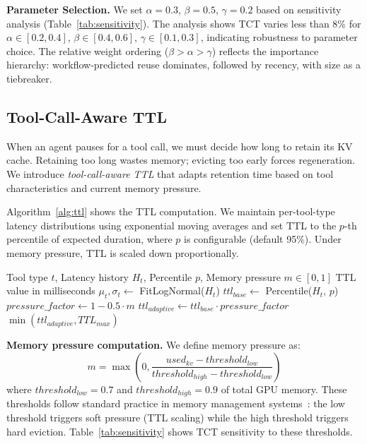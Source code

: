\documentclass[sigconf]{acmart}
\begin{document}
\textbf{Parameter Selection.} We set $\alpha = 0.3$, $\beta = 0.5$, $\gamma = 0.2$ based on sensitivity analysis (Table~\ref{tab:sensitivity}). The analysis shows TCT varies less than 8\% for $\alpha \in [0.2, 0.4]$, $\beta \in [0.4, 0.6]$, $\gamma \in [0.1, 0.3]$, indicating robustness to parameter choice. The relative weight ordering ($\beta > \alpha > \gamma$) reflects the importance hierarchy: workflow-predicted reuse dominates, followed by recency, with size as a tiebreaker.

\subsection{Tool-Call-Aware TTL}
\label{sec:ttl}

When an agent pauses for a tool call, we must decide how long to retain its KV cache. Retaining too long wastes memory; evicting too early forces regeneration. We introduce \emph{tool-call-aware TTL} that adapts retention time based on tool characteristics and current memory pressure.

Algorithm~\ref{alg:ttl} shows the TTL computation. We maintain per-tool-type latency distributions using exponential moving averages and set TTL to the $p$-th percentile of expected duration, where $p$ is configurable (default 95\%). Under memory pressure, TTL is scaled down proportionally.

\begin{algorithm}[t]
\caption{Tool-Call-Aware TTL Computation}
\label{alg:ttl}
\begin{algorithmic}[1]
\REQUIRE Tool type $t$, Latency history $H_t$, Percentile $p$, Memory pressure $m \in [0,1]$
\ENSURE TTL value in milliseconds
\STATE $\mu_t, \sigma_t \gets$ FitLogNormal($H_t$) 
\STATE $ttl_{base} \gets$ Percentile($H_t$, $p$)
\STATE $pressure\_factor \gets 1 - 0.5 \cdot m$ 
\STATE $ttl_{adaptive} \gets ttl_{base} \cdot pressure\_factor$
\RETURN $\min(ttl_{adaptive}, TTL_{max})$ 
\end{algorithmic}
\end{algorithm}

\textbf{Memory pressure computation.} We define memory pressure as:
\begin{equation}
\label{eq:pressure}
    m = \max\left(0, \frac{used_{kv} - threshold_{low}}{threshold_{high} - threshold_{low}}\right)
\end{equation}
where $threshold_{low} = 0.7$ and $threshold_{high} = 0.9$ of total GPU memory. These thresholds follow standard practice in memory management systems~\cite{denning1970vm,rhu2016vdnn}: the low threshold triggers soft pressure (TTL scaling) while the high threshold triggers hard eviction. Table~\ref{tab:sensitivity} shows TCT sensitivity to these thresholds.
\end{document}
